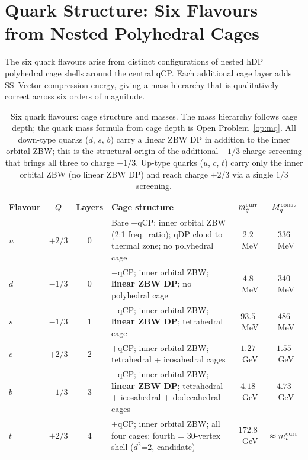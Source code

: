 \documentclass[11pt,letterpaper]{article}
\begin{document}
\section{Quark Structure: Six Flavours from Nested Polyhedral Cages}
\label{sec:quarks}

The six quark flavours arise from distinct configurations of nested
hDP polyhedral cage shells around the central qCP.  Each additional
cage layer adds SS~Vector compression energy, giving a mass hierarchy
that is qualitatively correct across six orders of magnitude.

\begin{table}[H]
\centering
\caption{Six quark flavours: cage structure and masses.  The mass
  hierarchy follows cage depth; the quark mass formula from cage
  depth is Open Problem~\ref{op:mq}.
  All down-type quarks ($d$, $s$, $b$) carry a linear ZBW DP
  in addition to the inner orbital ZBW; this is the structural
  origin of the additional $+1/3$ charge screening that brings
  all three to charge $-1/3$.  Up-type quarks ($u$, $c$, $t$)
  carry only the inner orbital ZBW (no linear ZBW DP) and
  reach charge $+2/3$ via a single $1/3$ screening.}
\label{tab:quarks}
\begin{tabular}{@{}lccp{5.2cm}cc@{}}
\toprule
Flavour & $Q$ & Layers & Cage structure & $m_q^{\rm curr}$ & $M_q^{\rm const}$ \\
\midrule
$u$ & $+2/3$ & 0 & Bare $+$qCP; inner orbital ZBW (2:1 freq.\ ratio);
    qDP cloud to thermal zone; no polyhedral cage
  & $2.2$~MeV & $336$~MeV \\
$d$ & $-1/3$ & 0 & $-$qCP; inner orbital ZBW; \textbf{linear ZBW DP};
    no polyhedral cage
  & $4.8$~MeV & $340$~MeV \\
$s$ & $-1/3$ & 1 & $-$qCP; inner orbital ZBW; \textbf{linear ZBW DP};
    tetrahedral cage
  & $93.5$~MeV & $486$~MeV \\
$c$ & $+2/3$ & 2 & $+$qCP; inner orbital ZBW;
    tetrahedral + icosahedral cages
  & $1.27$~GeV & $1.55$~GeV \\
$b$ & $-1/3$ & 3 & $-$qCP; inner orbital ZBW; \textbf{linear ZBW DP};
    tetrahedral + icosahedral + dodecahedral cages
  & $4.18$~GeV & $4.73$~GeV \\
$t$ & $+2/3$ & 4 & $+$qCP; inner orbital ZBW;
    all four cages; fourth = 30-vertex shell ($d^2$=2, candidate)
  & $172.8$~GeV & $\approx m_t^{\rm curr}$ \\
\bottomrule
\end{tabular}
\end{table}
\end{document}
